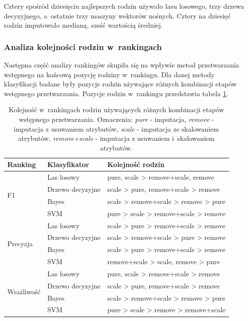 \documentclass[../thesis.tex]{subfiles}
\begin{document}
Cztery spośród dziesięciu najlepszych rodzin używało lasu losowego, trzy drzewa decyzyjnego, a~ostatnie trzy maszyny wektorów nośnych. Cztery na dziesięć rodzin imputowało medianą, sześć wartością średniej.

\subsubsection{Analiza kolejności rodzin w~rankingach}

Następna część analizy rankingów skupiła się na wpływie metod przetwarzania wstępnego na końcową pozycję rodziny w~rankingu. Dla danej metody klasyfikacji badane były pozycje rodzin używające różnych kombinacji etapów wstępnego przetwarzania. Pozycje rodzin w~rankingu przedstawia tabela \ref{results:table_rankings}.

\begin{table}[h]
\begin{center}
\begin{tabular}{ | l | l | p{100mm} | }
\hline
\rowcolor{lightgray} Ranking & Klasyfikator & Kolejność rodzin \\\hline

\multirow{4}{*}{F1} & Las losowy & pure, scale > remove+scale, remove \\\cline{2-3}
                    & Drzewo decyzyjne & scale > pure, remove+scale > remove\\\cline{2-3}
                    & Bayes & scale > remove+scale > remove > pure\\\cline{2-3}
                    & SVM & pure > scale > remove+scale > remove\\\hline
\multirow{4}{*}{Precyzja} & Las losowy & scale > pure > remove+scale > remove \\\cline{2-3}
                    & Drzewo decyzyjne & scale > remove+scale > pure > remove\\\cline{2-3}
                    & Bayes & scale > pure > remove+scale > remove\\\cline{2-3}
                    & SVM & remove+scale > scale, remove > pure\\\hline
\multirow{4}{*}{Wrażliwość} & Las losowy & pure, scale > remove+scale > remove \\\cline{2-3}
                    & Drzewo decyzyjne & scale > pure, remove+scale > remove\\\cline{2-3}
                    & Bayes & scale > remove+scale > remove > pure\\\cline{2-3}
                    & SVM & pure > scale > remove > remove+scale\\\hline

\end{tabular}
\caption{Kolejność w~rankingach rodzin używających różnych kombinacji etapów wstępnego przetwarzania. Oznaczenia: \emph{pure} - imputacja, \emph{remove} - imputacja z usuwaniem atrybutów, \emph{scale} - imputacja ze skalowaniem atrybutów, \emph{remove+scale} - imputacja z usuwaniem i~skalowaniem atrybutów.}
\label{results:table_rankings}
\end{center}
\end{table}
\end{document}
